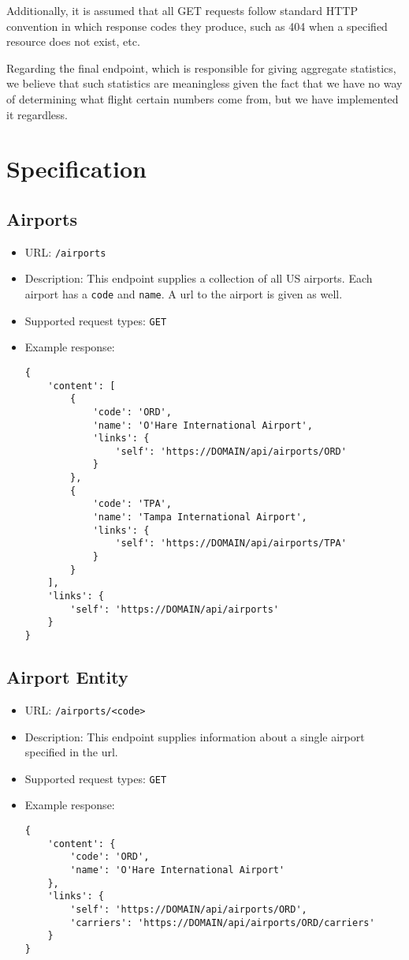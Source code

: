 \documentclass{article}
\begin{document}
	Additionally, it is assumed that all GET requests follow standard HTTP convention in which response codes they produce, such as 404 when a specified resource does not exist, etc.
	
	Regarding the final endpoint, which is responsible for giving aggregate statistics, we believe that such statistics are meaningless given the fact that we have no way of determining what flight certain numbers come from, but we have implemented it regardless.

\section{Specification}

	\subsection{Airports}
		\begin{itemize}
			\item URL: \texttt{/airports}
			\item Description: This endpoint supplies a collection of all US airports. Each airport has a \texttt{code} and \texttt{name}. A url to the airport is given as well.
			\item Supported request types: \texttt{GET}
			\item Example response:
			\begin{lstlisting}
{
    'content': [
    	{
    		'code': 'ORD',
    		'name': 'O'Hare International Airport',
    		'links': {
    			'self': 'https://DOMAIN/api/airports/ORD'
    		}
    	},
    	{
    		'code': 'TPA',
    		'name': 'Tampa International Airport',
    		'links': {
    			'self': 'https://DOMAIN/api/airports/TPA'
    		}
    	}
    ],
    'links': {
        'self': 'https://DOMAIN/api/airports'
    }
}

			\end{lstlisting}
		\end{itemize}
	
	\subsection{Airport Entity}
	    \begin{itemize}
			\item URL: \texttt{/airports/<code>}
			\item Description: This endpoint supplies information about a single airport specified in the url.
			\item Supported request types: \texttt{GET}
			\item Example response:
			\begin{lstlisting}
{
    'content': {
		'code': 'ORD',
		'name': 'O'Hare International Airport'
	},
    'links': {
        'self': 'https://DOMAIN/api/airports/ORD',
        'carriers': 'https://DOMAIN/api/airports/ORD/carriers'
    }
}

			\end{lstlisting}
		\end{itemize}
		
\end{document}
